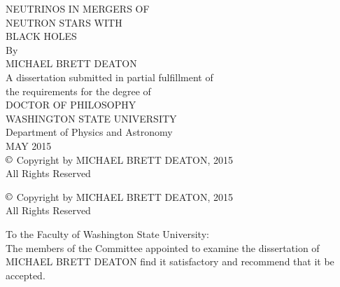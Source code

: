 \documentclass[12pt]{report}
\begin{document}

\begin{titlepage}
  \begin{singlespace}
    \begin{center}
      {\uppercase{
          Neutrinos in Mergers of\\
          Neutron Stars with\\
          Black Holes}}\\
      \vspace{1.47in}
      By\\
      \bigskip
      \uppercase{Michael Brett Deaton}\\
      \vfill
      A dissertation submitted in partial fulfillment of\\
      the requirements for the degree of\\
      \bigskip
      \uppercase{Doctor of Philosophy}\\
      \bigskip \bigskip \bigskip
      \uppercase{Washington State University}\\
      Department of Physics and Astronomy\\
      \bigskip
      \uppercase{May 2015}\\
      \bigskip \bigskip \bigskip
      $\copyright$ Copyright by MICHAEL BRETT DEATON, 2015\\
      All Rights Reserved
    \end{center}
  \end{singlespace}
\end{titlepage}
\newpage

\thispagestyle{empty} %
\begin{center}
  \begin{singlespace}
    \null %
    \vfill
    $\copyright$ Copyright by \uppercase{Michael Brett Deaton}, 2015\\
    All Rights Reserved
  \end{singlespace}
\end{center}
\newpage

\begin{singlespace}
  \noindent
  To the Faculty of Washington State University:\\
  
  The members of the Committee appointed to examine the dissertation of
  \uppercase{Michael Brett Deaton}
  find it satisfactory and recommend that it be accepted.
  
  \begin{flushright}
    \\
    \\
  \end{flushright}
\end{singlespace}
\newpage
\end{document}
